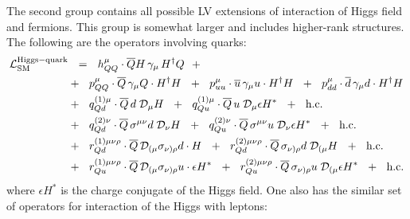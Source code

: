 \documentclass[12pt,preprintnumbers,nofootinbib]{revtex4}
\newcommand{\ov}{\overline}
\newcommand{\md}{\mathcal{D}}
\begin{document}
	The second group contains all possible LV extensions of interaction of
	Higgs field and fermions. 
	This group is somewhat larger and includes higher-rank structures.
	The following are the operators involving quarks:
\begin{align}
\notag
	\mathcal{L}_{\rm SM}^{\rm Higgs-quark} & ~~=~~
	h^{\mu}_{QQ} \cdot
	\ov{Q}H \, \gamma_\mu\, H^\dag Q ~~+~~
	\\
\notag
	&
	+~~
	p_{QQ}^\mu \cdot
	\ov{Q}\, \gamma_\mu Q \cdot H^\dag H ~~+~~
	p_{uu}^\mu \cdot
	\ov{u}\, \gamma_\mu u \cdot H^\dag H ~~+~~
	p_{dd}^\mu \cdot
	\ov{d}\, \gamma_\mu d \cdot H^\dag H 
	\\
\label{Higgs_quark}
	&
	+~~
	q^{(1)\mu}_{Qd} \cdot
	\ov{Q}\, d \; \md_\mu H ~~+~~
	q^{(1)\mu}_{Qu} \cdot
	\ov{Q}\, u \; \md_\mu \epsilon H^* ~~+~~
	\text{h.c.}
	\\
\notag
	&
	+~~
	q^{(2)\nu}_{Qd} \cdot
	\ov{Q}\, \sigma^{\mu\nu} d\; \md_\nu H ~~+~~
	q^{(2)\nu}_{Qu} \cdot
	\ov{Q}\, \sigma^{\mu\nu} u\; \md_\nu \epsilon H^* ~~+~~
	\text{h.c.}
	\\
\notag
	&
	+~~
	r^{(1)\mu\nu\rho}_{Qd} \cdot
	\ov{Q}\, \md_{(\mu} \sigma_{\nu)\rho} d \cdot H ~~+~~
	r^{(2)\mu\nu\rho}_{Qd} \cdot
	\ov{Q}\, \sigma_{\nu)\rho} d \; \md_{(\mu} H ~~+~~
	\text{h.c.}
	\\
\notag
	&
	+~~
	r^{(1)\mu\nu\rho}_{Qu} \cdot
	\ov{Q}\, \md_{(\mu} \sigma_{\nu)\rho} u \cdot \epsilon H^* ~~+~~
	r^{(2)\mu\nu\rho}_{Qu} \cdot
	\ov{Q}\, \sigma_{\nu)\rho} u \; \md_{(\mu} \epsilon H^* ~~+~~
	\text{h.c.}
\end{align}
	where $ \epsilon H^* $ is the charge conjugate of the Higgs field.	
	One also has the similar set of operators for interaction of the Higgs 
	with leptons:
\end{document}
